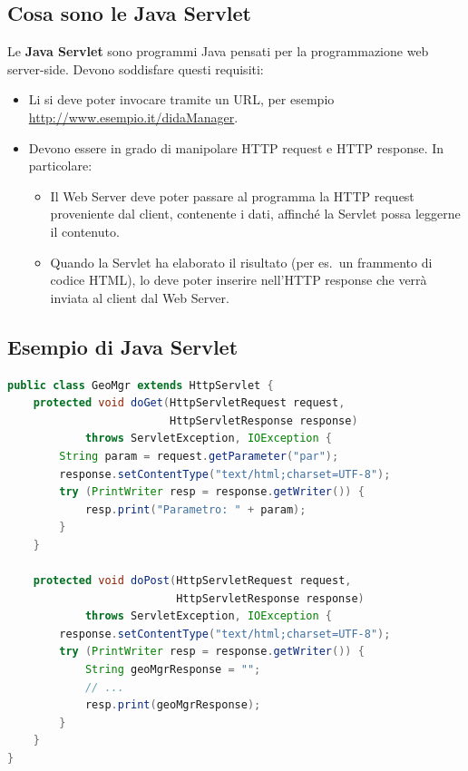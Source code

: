 \subsection{Cosa sono le Java Servlet}

Le \textbf{Java Servlet} sono programmi Java pensati per la programmazione web server-side. Devono soddisfare questi requisiti:

\begin{itemize}
    \item Li si deve poter invocare tramite un URL, per esempio \url{http://www.esempio.it/didaManager}.
    \item Devono essere in grado di manipolare HTTP request e HTTP response. In particolare:
    \begin{itemize}
        \item Il Web Server deve poter passare al programma la HTTP request proveniente dal client, contenente i dati, affinché la Servlet possa leggerne il contenuto.
        \item Quando la Servlet ha elaborato il risultato (per es.\ un frammento di codice HTML), lo deve poter inserire nell'HTTP response che verrà inviata al client dal Web Server.
    \end{itemize}
\end{itemize}

\subsection{Esempio di Java Servlet}

\begin{lstlisting}[language=Java]
public class GeoMgr extends HttpServlet {
    protected void doGet(HttpServletRequest request,
                         HttpServletResponse response)
            throws ServletException, IOException {
        String param = request.getParameter("par");
        response.setContentType("text/html;charset=UTF-8");
        try (PrintWriter resp = response.getWriter()) {
            resp.print("Parametro: " + param);
        }
    }

    protected void doPost(HttpServletRequest request,
                          HttpServletResponse response)
            throws ServletException, IOException {
        response.setContentType("text/html;charset=UTF-8");
        try (PrintWriter resp = response.getWriter()) {
            String geoMgrResponse = "";
            // ...
            resp.print(geoMgrResponse);
        }
    }
}
\end{lstlisting}

